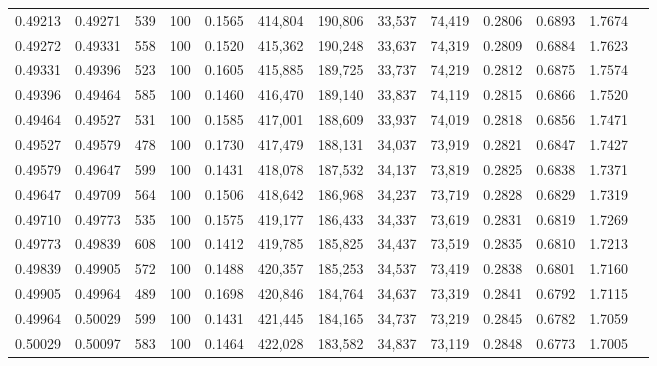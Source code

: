 \begin{tabular}{rrrrrrrrrrrrr}
0.49213 & 0.49271 &   539 & 100 &                                     0.1565 & 414,804 & 190,806 &  33,537 &  74,419 & 0.2806 & 0.6893 & 1.7674 \\
0.49272 & 0.49331 &   558 & 100 &                                     0.1520 & 415,362 & 190,248 &  33,637 &  74,319 & 0.2809 & 0.6884 & 1.7623 \\
0.49331 & 0.49396 &   523 & 100 &                                     0.1605 & 415,885 & 189,725 &  33,737 &  74,219 & 0.2812 & 0.6875 & 1.7574 \\
0.49396 & 0.49464 &   585 & 100 &                                     0.1460 & 416,470 & 189,140 &  33,837 &  74,119 & 0.2815 & 0.6866 & 1.7520 \\
0.49464 & 0.49527 &   531 & 100 &                                     0.1585 & 417,001 & 188,609 &  33,937 &  74,019 & 0.2818 & 0.6856 & 1.7471 \\
0.49527 & 0.49579 &   478 & 100 &                                     0.1730 & 417,479 & 188,131 &  34,037 &  73,919 & 0.2821 & 0.6847 & 1.7427 \\
0.49579 & 0.49647 &   599 & 100 &                                     0.1431 & 418,078 & 187,532 &  34,137 &  73,819 & 0.2825 & 0.6838 & 1.7371 \\
0.49647 & 0.49709 &   564 & 100 &                                     0.1506 & 418,642 & 186,968 &  34,237 &  73,719 & 0.2828 & 0.6829 & 1.7319 \\
0.49710 & 0.49773 &   535 & 100 &                                     0.1575 & 419,177 & 186,433 &  34,337 &  73,619 & 0.2831 & 0.6819 & 1.7269 \\
0.49773 & 0.49839 &   608 & 100 &                                     0.1412 & 419,785 & 185,825 &  34,437 &  73,519 & 0.2835 & 0.6810 & 1.7213 \\
0.49839 & 0.49905 &   572 & 100 &                                     0.1488 & 420,357 & 185,253 &  34,537 &  73,419 & 0.2838 & 0.6801 & 1.7160 \\
0.49905 & 0.49964 &   489 & 100 &                                     0.1698 & 420,846 & 184,764 &  34,637 &  73,319 & 0.2841 & 0.6792 & 1.7115 \\
0.49964 & 0.50029 &   599 & 100 &                                     0.1431 & 421,445 & 184,165 &  34,737 &  73,219 & 0.2845 & 0.6782 & 1.7059 \\
0.50029 & 0.50097 &   583 & 100 &                                     0.1464 & 422,028 & 183,582 &  34,837 &  73,119 & 0.2848 & 0.6773 & 1.7005 \\

\end{tabular}
